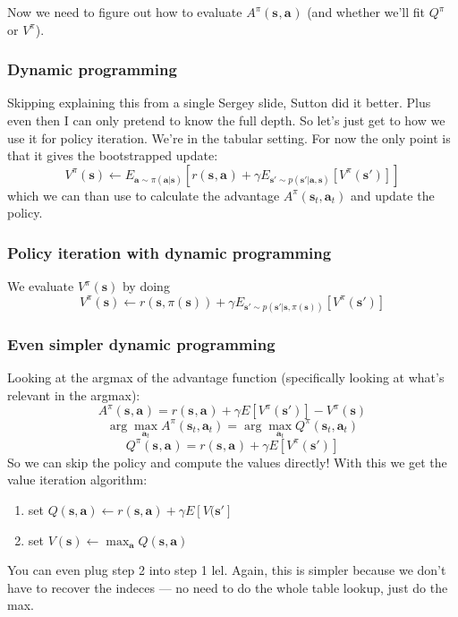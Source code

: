 \documentclass{report}
\newcommand{\argmax}{\arg\!\max}
\begin{document}
Now we need to figure out how to evaluate $A^\pi (\bm{s}_{}, \bm{a}_{}) $ (and whether
we'll fit $Q^\pi$ or $V^\pi$).
\subsubsection{Dynamic programming}
Skipping explaining this from a single Sergey slide, Sutton did it better.
Plus even then I can only pretend to know the full depth.
So let's just get to how we use it for policy iteration.
We're in the tabular setting.
For now the only point is that it gives the bootstrapped update:
\begin{equation}
V^\pi(\bm{s}) \leftarrow E_{\bm{a} \sim \pi(\bm{a}|\bm{s})} \left[ r(\bm{s}_{}, \bm{a}_{}) + \gamma E_{\bm{s}' \sim p(\bm{s}' |\bm{a},\bm{s}  )} [V^\pi(\bm{s}') ] \right] 
\end{equation}
which we can than use to calculate the advantage $A^\pi (\bm{s}_{t}, \bm{a}_{t})$ and update the policy.

\subsubsection{Policy iteration with dynamic programming}
We evaluate $V^\pi(\bm{s})$ by doing
\begin{equation}
		V^\pi (\bm{s}) \leftarrow r(\bm{s}, \pi(\bm{s})) + 
		\gamma E_{\bm{s}' \sim p(\bm{s}'| \bm{s}, \pi(\bm{s}))}
				\left[ V^\pi(\bm{s}') \right] 
\end{equation}


\subsubsection{Even simpler dynamic programming}
Looking at the argmax of the advantage function (specifically looking at 
what's relevant in the argmax):
\begin{equation}
		A^\pi (\bm{s}_{}, \bm{a}_{}) = r(\bm{s}_{}, \bm{a}_{}) + \gamma E \left[ V^\pi(\bm{s}') \right]- V^\pi(\bm{s})  
\end{equation}
\begin{equation}
		\argmax_{\bm{a}_t} A^\pi (\bm{s}_{t}, \bm{a}_{t}) = 
		\argmax_{\bm{a}_t} Q^\pi (\bm{s}_{t}, \bm{a}_{t}) 
\end{equation}
\begin{equation}
		Q^\pi(\bm{s}_{}, \bm{a}_{}) = r (\bm{s}_{}, \bm{a}_{}) + \gamma E \left[ V^\pi(\bm{s}')\right]
\end{equation}
So we can skip the policy and compute the values directly!
With this we get the value  iteration algorithm:
\begin{enumerate}
		\item set $Q(\bm{s}, \bm{a}) \leftarrow r (\bm{s}, \bm{a}) + \gamma E[V(\bm{s}']$
		\item set $V(\bm{s}) \leftarrow \max_{\bm{a}} Q(\bm{s}, \bm{a})$
\end{enumerate}
You can even plug step 2 into step 1 lel.
Again, this is simpler because we don't have to recover the indeces --- no need to do the whole table lookup,
just do the max.
\end{document}
